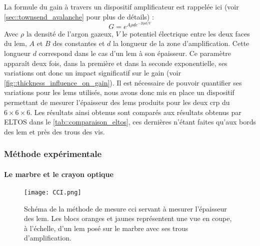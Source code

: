                La formule du gain à travers un dispositif amplificateur est rappelée ici (voir \autoref{sec::townsend_avalanche} pour plus de détails) :
                \begin{equation}\label{eq::townsend_avalanche_2}
                    G = e^{A\rho d e^{-B\rho d/V}}
                \end{equation}
                Avec $\rho$ la densité de l'argon gazeux, $V$ le potentiel électrique entre les deux faces du \gls{lem}, $A$ et $B$ des constantes et $d$ la longueur de la zone d'amplification. Cette longueur $d$ correspond dans le cas d'un \gls{lem} à son épaisseur. Ce paramètre apparaît deux fois, dans la première et dans la seconde exponentielle, ses variations ont donc un impact significatif sur le gain (voir \autoref{fig::thickness_influence_on_gain}). Il est nécessaire de pouvoir quantifier ses variations pour les \glspl{lem} utilisés, nous avons donc mis en place un dispositif permettant de mesurer l'épaisseur des \glspl{lem} produits pour les deux \gls{crp} du $6\times6\times6$. Les résultats ainsi obtenus sont comparés aux résultats obtenus par ELTOS dans le \autoref{tab::comparaison_eltos}, ces dernières n'étant faites qu'aux bords des \gls{lem} et près des trous des vis.
                
            \subsubsection{Méthode expérimentale}
                \paragraph{Le marbre et le crayon optique}
                
                    \begin{wrapfigure}{r}{0.4\textwidth}
                        \texttt{[image: CCI.png]}
                        \caption[Schéma de la méthode de mesure \gls{cci}.]{Schéma de la méthode de mesure \gls{cci} servant à mesurer l'épaisseur des \gls{lem}. Les blocs oranges et jaunes représentent une vue en coupe, à l'échelle, d'un \gls{lem} posé sur le marbre avec ses trous d'amplification.}
                        \label{fig::CCI}
                    \end{wrapfigure}
                    
